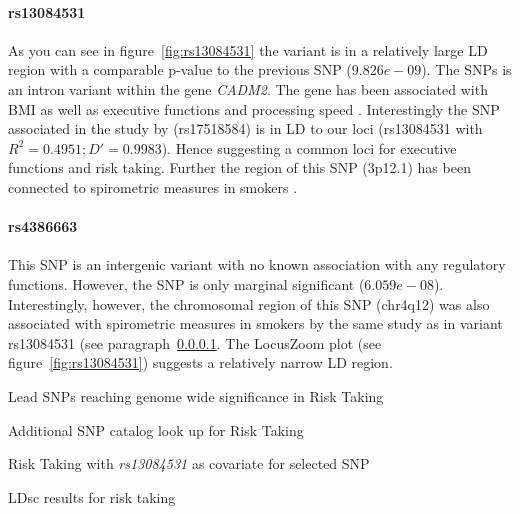 \paragraph{rs13084531}
\label{par:rs13084531}
As you can see in figure~\ref{fig:rs13084531} the variant is in a relatively large LD region with a comparable p-value to the previous SNP ($9.826e-09$).
The SNPs is an intron variant within the gene \textit{CADM2}.
The gene has been associated with BMI \citep{Speliotes2010} as well as executive functions and processing speed \citep{Ibrahim-Verbaas2015}.
Interestingly the SNP associated in the study by \cite{Ibrahim-Verbaas2015} (rs17518584) is in LD to our loci (rs13084531 with $R^2=0.4951;D'=0.9983$).
Hence suggesting a common loci for executive functions and risk taking.
Further the region of this SNP (3p12.1) has been connected to spirometric measures in smokers \citep{Lutz2015}.

\paragraph{rs4386663}
\label{par:rs4386663}
This SNP is an intergenic variant with no known association with any regulatory functions.
However, the SNP is only marginal significant ($6.059e-08$).
Interestingly, however, the chromosomal region of this SNP (chr4q12) was also associated with spirometric measures in smokers by the same study as in variant rs13084531 (see paragraph~\ref{par:rs13084531}.
The LocusZoom plot (see figure~\ref{fig:rs13084531}) suggests a relatively narrow LD region. 

\begin{table}
	\small
	\centering
	\caption{Lead SNPs reaching genome wide significance in Risk Taking}\label{tab:lead_snps_risk}
	
\end{table}

\begin{table}[!htpb]
	\centering
	\caption{Additional SNP catalog look up for Risk Taking}\label{tab:gwas_risk_catalog}
	\resizebox{\textwidth}{!}{}
\end{table}

\begin{table}[!htpb]
	\small
	\centering
	\caption{Risk Taking with \textit{rs13084531} as covariate for selected SNP}
	\label{tab:conditional}
	\resizebox{\textwidth}{!}{}
\end{table}

\begin{table}[!htpb]
	\centering
	\caption{LDsc results for risk taking}
	\label{tab:ldscrisk}
	
\end{table}

